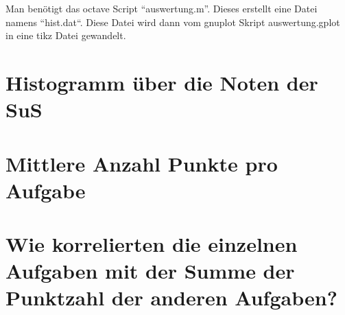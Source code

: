 \documentclass{article}
\def\folder{/tmp/auswertung}
\begin{document}
Man benötigt das octave Script ``auswertung.m''. Dieses erstellt eine Datei namens ``hist.dat``. 
Diese Datei wird dann vom gnuplot Skript auswertung.gplot in eine tikz Datei gewandelt.

\section{Histogramm über die Noten der SuS}



\section{Mittlere Anzahl Punkte pro Aufgabe}


\section{Wie korrelierten die einzelnen Aufgaben mit der Summe der Punktzahl der anderen Aufgaben?}





\end{document}
